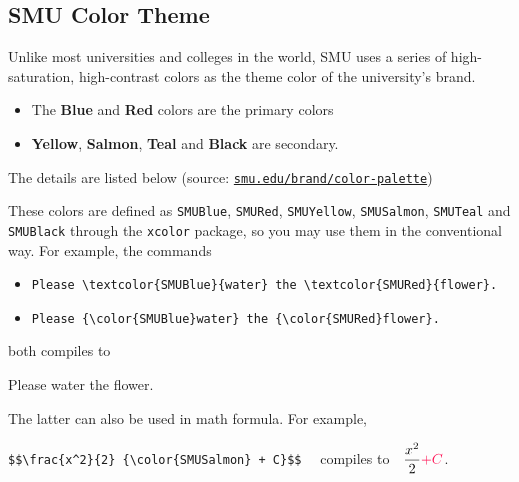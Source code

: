 \documentclass[12pt, aspectratio=169]{beamer}
\begin{document}
\subsection{SMU Color Theme}

\begin{frame}{\insertsubsection}
Unlike most universities and colleges in the world, SMU uses a series of high-saturation, high-contrast colors as the theme color of the university's brand. 
\begin{itemize}
    \item The \textcolor{SMUBlue}{\bf Blue} and \textcolor{SMURed}{\bf Red} colors are the primary colors
    \item \textcolor{SMUYellow}{\bf Yellow}, \textcolor{SMUSalmon}{\bf Salmon}, \textcolor{SMUTeal}{\bf Teal} and \textcolor{SMUBlack}{\bf Black} are secondary.
\end{itemize}
The details are listed below (source: \href{https://www.smu.edu/brand/color-palette}{\texttt{smu.edu/brand/color-palette}})
\begin{center}

\end{center}
\end{frame}

\begin{frame}[fragile]{\insertsubsection}
These colors are defined as \textcolor{SMUBlue}{\texttt{SMUBlue}}, \textcolor{SMURed}{\texttt{SMURed}}, \textcolor{SMUYellow}{\texttt{SMUYellow}}, \textcolor{SMUSalmon}{\texttt{SMUSalmon}}, \textcolor{SMUTeal}{\texttt{SMUTeal}} and \textcolor{SMUBlack}{\texttt{SMUBlack}} through the \texttt{xcolor} package, so you may use them in the conventional way. For example, the commands
\vspace{-0.5em}
\begin{itemize}
    \item \lstinline[basicstyle=\ttfamily\small]|Please \textcolor{SMUBlue}{water} the \textcolor{SMURed}{flower}.|
    \item \lstinline[basicstyle=\ttfamily\small]|Please {\color{SMUBlue}water} the {\color{SMURed}flower}.|
\end{itemize}
\vspace{-0.5em}
both compiles to
{\par\centering
Please {\color{SMUBlue}water} the {\color{SMURed}flower}.
\par}
The latter can also be used in math formula. For example,
{\par\centering 
\verb|$$\frac{x^2}{2} {\color{SMUSalmon} + C}$$| \ \ compiles to\ \  $\displaystyle \frac{x^2}{2}{\color{SMUSalmon} + C}$.
\par}

\end{frame}
\end{document}
